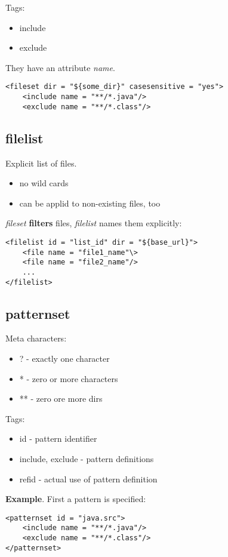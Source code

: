 \documentclass{report}
\begin{document}
Tags:
\begin{itemize}
  \item include
  \item exclude
\end{itemize}
They have an attribute \textit{name}.

\begin{verbatim}
<fileset dir = "${some_dir}" casesensitive = "yes">
	<include name = "**/*.java"/>
	<exclude name = "**/*.class"/>
\end{verbatim}

\subsection{filelist}
Explicit list of files. 
\begin{itemize}
  \item no wild cards
  \item can be applid to non-existing files, too 
\end{itemize}
\textit{fileset} \textbf{filters}
files, \textit{filelist} names them explicitly:
\begin{verbatim}
<filelist id = "list_id" dir = "${base_url}">
	<file name = "file1_name"\>
	<file name = "file2_name"/>
	...
</filelist>
\end{verbatim}

\subsection{patternset}
Meta characters:
\begin{itemize}
  \item ? - exactly one character
  \item * - zero or more characters
  \item ** - zero ore more dirs
\end{itemize}

Tags:
\begin{itemize}
  \item id - pattern identifier
  \item include, exclude - pattern definitions
  \item refid - actual use of pattern definition
\end{itemize}

\textbf{Example}. First a pattern is specified:
\begin{verbatim}
<patternset id = "java.src">
	<include name = "**/*.java"/>
	<exclude name = "**/*.class"/>
</patternset>
\end{verbatim}
\end{document}
